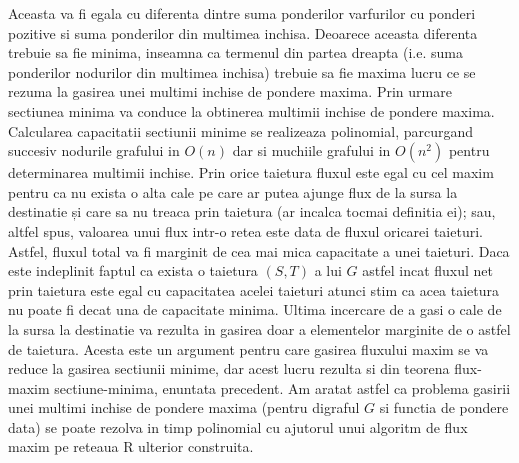 \documentclass{article}
\begin{document}
Aceasta va fi egala cu diferenta dintre suma ponderilor varfurilor cu ponderi pozitive si suma ponderilor din multimea inchisa. Deoarece aceasta diferenta trebuie sa fie minima, inseamna ca termenul din partea dreapta (i.e. suma ponderilor nodurilor din multimea inchisa) trebuie sa fie maxima lucru ce se rezuma la gasirea unei multimi inchise de pondere maxima. Prin urmare sectiunea minima va conduce la obtinerea multimii inchise de pondere maxima. Calcularea capacitatii sectiunii minime se realizeaza polinomial, parcurgand succesiv nodurile grafului in $O(n)$ dar si muchiile grafului in $O(n^2)$ pentru determinarea multimii inchise.
\newline
\newline
Prin orice taietura fluxul este egal cu cel maxim pentru ca nu exista o alta cale pe care ar putea ajunge flux de la sursa la destinatie și care sa nu treaca prin taietura (ar incalca tocmai definitia ei); sau, altfel spus, valoarea unui flux intr-o retea este data de fluxul oricarei taieturi. Astfel, fluxul total va fi marginit de cea mai mica capacitate a unei taieturi. Daca este indeplinit faptul ca exista o taietura $(S,T)$ a lui $G$ astfel incat fluxul net prin taietura este egal cu capacitatea acelei taieturi atunci stim ca acea taietura nu poate fi decat una de capacitate minima. Ultima incercare de a gasi o cale de la sursa la destinatie va rezulta in gasirea doar a elementelor marginite de o astfel de taietura. Acesta este un argument pentru care gasirea fluxului maxim se va reduce la gasirea sectiunii minime, dar acest lucru rezulta si din teorena flux-maxim sectiune-minima, enuntata precedent. 
\newline
\newline
Am aratat astfel ca problema gasirii unei multimi inchise de pondere maxima (pentru digraful $G$ si functia de pondere data) se poate rezolva in timp polinomial cu ajutorul unui algoritm de flux maxim pe reteaua R ulterior construita.

\
\end{document}
